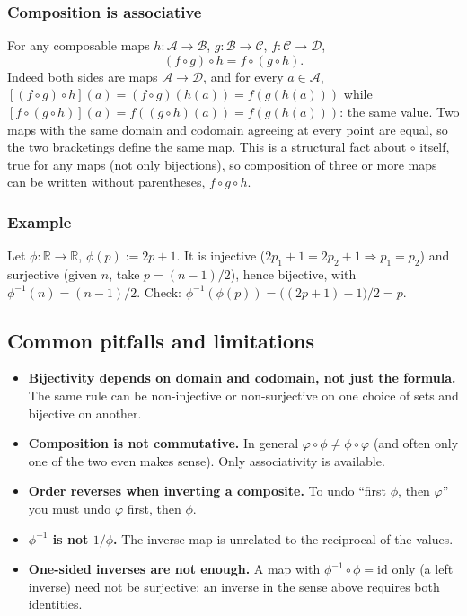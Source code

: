 \documentclass[11pt]{article}
\begin{document}
\subsubsection*{Composition is associative}
For any composable maps $h:\mathcal A\to\mathcal B$, $g:\mathcal B\to\mathcal C$, $f:\mathcal C\to\mathcal D$,
\[
(f\circ g)\circ h = f\circ(g\circ h).
\]
Indeed both sides are maps $\mathcal A\to\mathcal D$, and for every $a\in\mathcal A$, $[(f\circ g)\circ h](a) = (f\circ g)(h(a)) = f(g(h(a)))$ while $[f\circ(g\circ h)](a) = f((g\circ h)(a)) = f(g(h(a)))$: the same value. Two maps with the same domain and codomain agreeing at every point are equal, so the two bracketings define the same map. This is a structural fact about $\circ$ itself, true for any maps (not only bijections), so composition of three or more maps can be written without parentheses, $f\circ g\circ h$.

\subsubsection*{Example}
Let $\phi:\mathbb R\to\mathbb R$, $\phi(p):=2p+1$. It is injective ($2p_1+1=2p_2+1\Rightarrow p_1=p_2$) and surjective (given $n$, take $p=(n-1)/2$), hence bijective, with $\phi^{-1}(n)=(n-1)/2$. Check: $\phi^{-1}(\phi(p))=\big((2p+1)-1\big)/2=p$.

\subsection*{Common pitfalls and limitations}

\begin{itemize}
  \item \textbf{Bijectivity depends on domain and codomain, not just the formula.} The same rule can be non-injective or non-surjective on one choice of sets and bijective on another.
  \item \textbf{Composition is not commutative.} In general $\varphi\circ\phi\neq\phi\circ\varphi$ (and often only one of the two even makes sense). Only associativity is available.
  \item \textbf{Order reverses when inverting a composite.} To undo ``first $\phi$, then $\varphi$'' you must undo $\varphi$ first, then $\phi$.
  \item \textbf{$\phi^{-1}$ is not $1/\phi$.} The inverse map is unrelated to the reciprocal of the values.
  \item \textbf{One-sided inverses are not enough.} A map with $\phi^{-1}\circ\phi=\mathrm{id}$ only (a left inverse) need not be surjective; an inverse in the sense above requires both identities.
\end{itemize}
\end{document}
